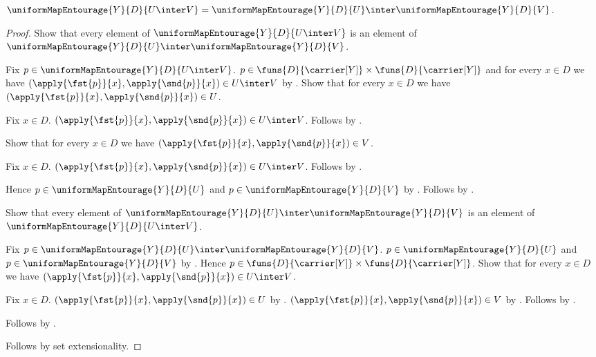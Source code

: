 \begin{proposition}\label{uniform_map_entourage_intersection}
    $\uniformMapEntourage{Y}{D}{U\inter V}=
        \uniformMapEntourage{Y}{D}{U}\inter
            \uniformMapEntourage{Y}{D}{V}$.
\end{proposition}
\begin{proof}
    Show that every element of $\uniformMapEntourage{Y}{D}{U\inter V}$ is
        an element of $\uniformMapEntourage{Y}{D}{U}\inter
            \uniformMapEntourage{Y}{D}{V}$.
    \begin{subproof}
        Fix $p\in\uniformMapEntourage{Y}{D}{U\inter V}$.
        $p\in\funs{D}{\carrier[Y]}\times\funs{D}{\carrier[Y]}$ and for
            every $x\in D$ we have
            $(\apply{\fst{p}}{x},\apply{\snd{p}}{x})\in U\inter V$ by
            .
        Show that for every $x\in D$ we have
            $(\apply{\fst{p}}{x},\apply{\snd{p}}{x})\in U$.
        \begin{subproof}
            Fix $x\in D$.
            $(\apply{\fst{p}}{x},\apply{\snd{p}}{x})\in U\inter V$.
            Follows by .
        \end{subproof}
        Show that for every $x\in D$ we have
            $(\apply{\fst{p}}{x},\apply{\snd{p}}{x})\in V$.
        \begin{subproof}
            Fix $x\in D$.
            $(\apply{\fst{p}}{x},\apply{\snd{p}}{x})\in U\inter V$.
            Follows by .
        \end{subproof}
        Hence $p\in\uniformMapEntourage{Y}{D}{U}$ and
            $p\in\uniformMapEntourage{Y}{D}{V}$ by
            .
        Follows by .
    \end{subproof}
    Show that every element of $\uniformMapEntourage{Y}{D}{U}\inter
        \uniformMapEntourage{Y}{D}{V}$ is an element of
        $\uniformMapEntourage{Y}{D}{U\inter V}$.
    \begin{subproof}
        Fix $p\in\uniformMapEntourage{Y}{D}{U}\inter
            \uniformMapEntourage{Y}{D}{V}$.
        $p\in\uniformMapEntourage{Y}{D}{U}$ and
            $p\in\uniformMapEntourage{Y}{D}{V}$ by .
        Hence $p\in\funs{D}{\carrier[Y]}\times\funs{D}{\carrier[Y]}$.
        Show that for every $x\in D$ we have
            $(\apply{\fst{p}}{x},\apply{\snd{p}}{x})\in U\inter V$.
        \begin{subproof}
            Fix $x\in D$.
            $(\apply{\fst{p}}{x},\apply{\snd{p}}{x})\in U$ by
                .
            $(\apply{\fst{p}}{x},\apply{\snd{p}}{x})\in V$ by
                .
            Follows by .
        \end{subproof}
        Follows by .
    \end{subproof}
    Follows by set extensionality.
\end{proof}

